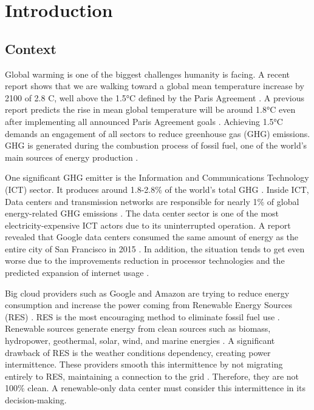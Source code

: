 \chapter{Introduction}
\label{cha:introduction}

\section{Context}

Global warming is one of the biggest challenges humanity is facing. A recent report shows that we are walking toward a global mean temperature increase by 2100 of 2.8 \degree C, well above the 1.5°C defined by the Paris Agreement \cite{lee2023ar6}. A previous report predicts the rise in mean global temperature will be around 1.8°C even after implementing all announced Paris Agreement goals \cite{tracker2022projections}. Achieving 1.5°C demands an engagement of all sectors to reduce greenhouse gas (GHG) emissions. GHG is generated during the combustion process of fossil fuel, one of the world's main sources of energy production \cite{olabi2022renewable}.

One significant GHG emitter is the Information and Communications Technology (ICT) sector. It produces around 1.8-2.8\% of the world's total GHG \cite{freitag2021climate}. Inside ICT, Data centers and transmission networks are responsible for nearly 1\% of global energy-related GHG emissions \cite{centres2022data}. The data center sector is one of the most electricity-expensive ICT actors due to its uninterrupted operation. A report revealed that Google data centers consumed the same amount of energy as the entire city of San Francisco in 2015 \cite{khan2018exploiting}. In addition, the situation tends to get even worse due to the improvements reduction in processor technologies and the predicted expansion of internet usage \cite{cisco2020cisco, freitag2021climate}.

Big cloud providers such as Google and Amazon are trying to reduce energy consumption and increase the power coming from Renewable Energy Sources (RES) \cite{Masanet984}. RES is the most encouraging method to eliminate fossil fuel use \cite{olabi2022renewable}. Renewable sources generate energy from clean sources such as biomass, hydropower, geothermal, solar, wind, and marine energies \cite{augustine2012renewable, panwar2011role, rostirolla2022survey, UNREnewable, gross2003progress}. A significant drawback of RES is the weather conditions dependency, creating power intermittence. These providers smooth this intermittence by not migrating entirely to RES, maintaining a connection to the grid \cite{rostirolla2022survey}. Therefore, they are not 100\% clean. A renewable-only data center must consider this intermittence in its decision-making. 

